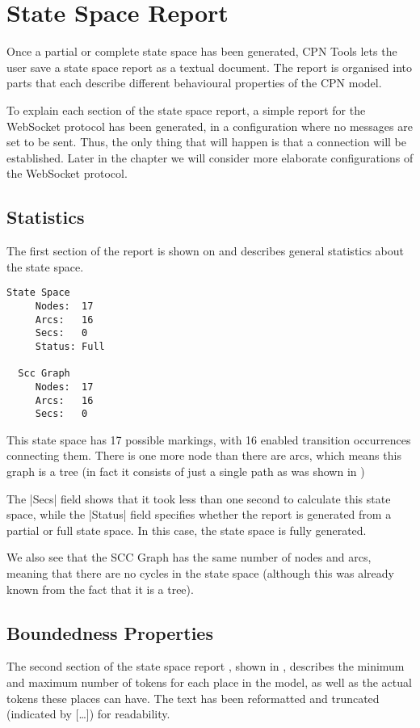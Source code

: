 \section{State Space Report}
Once a partial or complete state space has been generated, CPN Tools lets the
user save a state space report as a textual document. The report is organised
into parts that each describe different behavioural properties of the CPN model.

To explain each section of the state space report, a simple report for the
WebSocket protocol has been generated, in a configuration where no messages are
set to be sent. Thus, the only thing that will happen is that a connection will
be established. Later in the chapter we will consider more elaborate
configurations of the WebSocket protocol.
	
	\subsection{Statistics}
	The first section of the report is shown on  and
	describes general statistics about the state space.
	\begin{lstlisting}[language={},float=h,label=lst:ssa_statistics,
	caption=State Space Report: Statistics]
  State Space
     Nodes:  17
     Arcs:   16
     Secs:   0
     Status: Full

  Scc Graph
     Nodes:  17
     Arcs:   16
     Secs:   0

	\end{lstlisting}
	This state space has 17 possible markings, with 16 enabled transition
	occurrences connecting them. There is one more node than there are arcs, which
	means this graph is a tree (in fact it consists of just a single path as was
	shown in )
	
	The |Secs| field shows that it took less than one second to calculate this
	state space, while the |Status| field specifies whether the report is generated
	from a partial or full state space. In this case, the state space is fully
	generated.
	
	We also see that the SCC Graph has the same number of nodes and arcs, meaning
	that there are no cycles in the state space (although this was already known
	from the fact that it is a tree).
	
	\subsection{Boundedness Properties}
	The second section of the state space report , shown in ,
	describes the minimum and maximum number of tokens for each place in the model,
	as well as the actual tokens these places can have.
	The text has been reformatted and truncated (indicated by [\ldots]) for
	readability.
	
